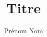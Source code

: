 \documentclass[a4paper,11pt,oneside]{report} %
\title{Titre}%
\author{Prénom Nom} %
\begin{document}

\tableofcontents
\pagebreak
\newpage
\listoffigures
\newpage
\listoftables
\newpage

















\end{document}
